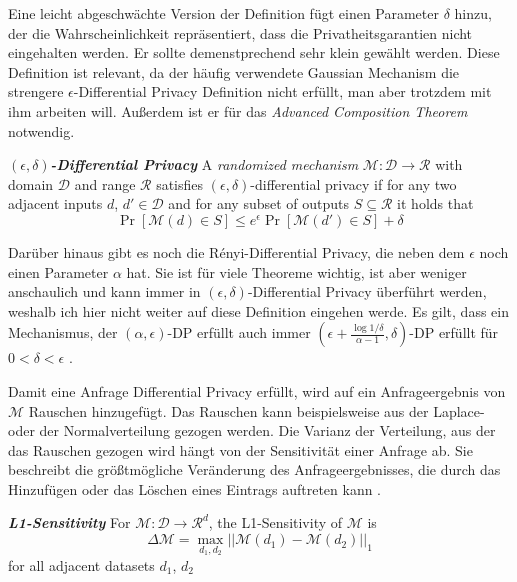 Eine leicht abgeschwächte Version der Definition fügt einen Parameter $\delta$ hinzu, der die Wahrscheinlichkeit repräsentiert, dass die Privatheitsgarantien nicht eingehalten werden. Er sollte demenstprechend sehr klein gewählt werden.\cite{dwork:2014} Diese Definition ist relevant, da der häufig verwendete Gaussian Mechanism die strengere $\epsilon$-Differential Privacy Definition nicht erfüllt, man aber trotzdem mit ihm arbeiten will. Außerdem ist er für das \textit{Advanced Composition Theorem} notwendig.

\begin{definition}\label{def:eps-delta-differential-privacy}
	\emph{\textbf{$(\epsilon, \delta)$-Differential Privacy}} A \textit{randomized mechanism} $\mathcal{M}: \mathcal{D} \rightarrow \mathcal{R}$ with domain $\mathcal{D}$ and range $\mathcal{R}$ satisfies $(\epsilon, \delta)$-differential privacy if for any two adjacent inputs $d$, $d' \in \mathcal{D}$ and for any subset of outputs $S \subseteq \mathcal{R}$ it holds that $$\Pr[\mathcal{M}(d) \in S] \leq e^{\epsilon} \Pr[\mathcal{M}(d') \in S] + \delta$$
\end{definition}

Darüber hinaus gibt es noch die Rényi-Differential Privacy, die neben dem $\epsilon$ noch einen Parameter $\alpha$ hat. Sie ist für viele Theoreme wichtig, ist aber weniger anschaulich und kann immer in $(\epsilon, \delta)$-Differential Privacy überführt werden, weshalb ich hier nicht weiter auf diese Definition eingehen werde. Es gilt, dass ein Mechanismus, der $(\alpha, \epsilon)$-DP erfüllt auch immer $(\epsilon + \frac{\log 1 / \delta}{\alpha - 1}, \delta)$-DP erfüllt für $0 < \delta < \epsilon$ \cite{mironov:2017}.

Damit eine Anfrage Differential Privacy erfüllt, wird auf ein Anfrageergebnis von $\mathcal{M}$ Rauschen hinzugefügt. Das Rauschen kann beispielsweise aus der Laplace- oder der Normalverteilung gezogen werden. Die Varianz der Verteilung, aus der das Rauschen gezogen wird hängt von der Sensitivität einer Anfrage ab. Sie beschreibt die größtmögliche Veränderung des Anfrageergebnisses, die durch das Hinzufügen oder das Löschen eines Eintrags auftreten kann \cite{dwork:2006}.

\begin{definition}\label{def:l1-sensitivity}
	\emph{\textbf{L1-Sensitivity}} For $\mathcal{M}: \mathcal{D} \rightarrow \mathcal{R}^{d}$, the L1-Sensitivity of $\mathcal{M}$ is 
	$$
	\Delta \mathcal{M} = \max_{d_1, d_2}{||\mathcal{M}(d_1) - \mathcal{M}(d_2)||}_1
	$$
	for all adjacent datasets $d_1$, $d_2$
\end{definition}

